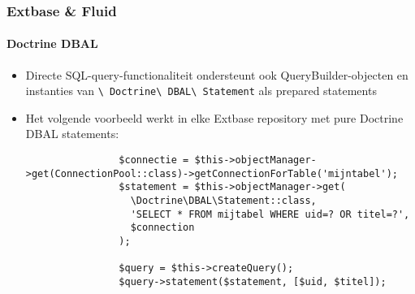 \begin{frame}[fragile]
	\frametitle{Extbase \& Fluid}
	\framesubtitle{Doctrine DBAL}

	\lstset{basicstyle=\tiny\ttfamily}

	\begin{itemize}
		\item Directe SQL-query-functionaliteit ondersteunt ook QueryBuilder-objecten en instanties van
			\texttt{\textbackslash
			Doctrine\textbackslash
			DBAL\textbackslash
			Statement} als prepared statements
		\item Het volgende voorbeeld werkt in elke Extbase repository met pure Doctrine DBAL statements:

			\begin{lstlisting}
				$connectie = $this->objectManager->get(ConnectionPool::class)->getConnectionForTable('mijntabel');
				$statement = $this->objectManager->get(
				  \Doctrine\DBAL\Statement::class,
				  'SELECT * FROM mijtabel WHERE uid=? OR titel=?',
				  $connection
				);

				$query = $this->createQuery();
				$query->statement($statement, [$uid, $titel]);
			\end{lstlisting}
	\end{itemize}

\end{frame}

